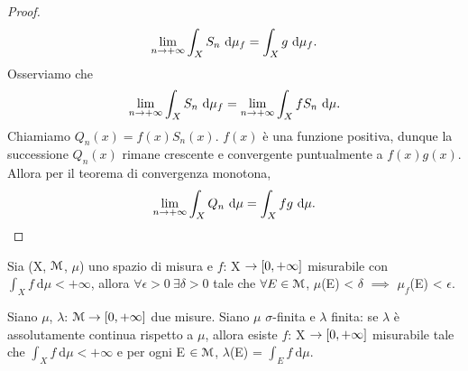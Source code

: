 \documentclass[Completo.tex]{subfiles}
\begin{document}
\begin{proof}
		\begin{equation*}
		\lim_{n \rightarrow +\infty} \int_X S_n \ \mathrm{d}\mu_f = \int_X g \ \mathrm{d}\mu_f.
		\end{equation*}	
		Osserviamo che
		\begin{equation*}
		\lim_{n \ra +\infty} \int_X S_n \ \mathrm{d}\mu_f = \lim_{n \ra +\infty} \int_X f S_n \ \mathrm{d}\mu.
		\end{equation*}
		Chiamiamo $Q_n(x) = f(x)S_n(x)$. $f(x)$ è una funzione positiva, dunque la successione $Q_n(x)$ rimane crescente e convergente puntualmente a $f(x)g(x)$. Allora per il teorema di convergenza monotona,
		\begin{equation*}
		\lim_{n \rightarrow +\infty} \int_X Q_n \ \mathrm{d}\mu = \int_X fg \ \mathrm{d}\mu.
		\end{equation*}
	\end{proof}
	\begin{Cor}
		Sia (X, $\eu[M]$, $\mu$) uno spazio di misura e $f$: X $\rightarrow [0, +\infty]$ misurabile con $\int_X f \ \mathrm{d}\mu < +\infty$, allora $\forall \epsilon > 0 \ \exists \delta > 0$ tale che $\forall E \in \eu[M]$, $\mu$(E) < $\delta$ $\implies$ $\mu_f$(E) < $\epsilon$.
	\end{Cor}
	\begin{Th}
		Siano $\mu$, $\lambda$: $\eu[M] \ra [0, +\infty]$ due misure. Siano $\mu$ $\sigma$-finita e $\lambda$ finita: se $\lambda$ è assolutamente continua rispetto a $\mu$, allora esiste $f$: X $\rightarrow [0, +\infty]$ misurabile tale che $\int_X f \ \mathrm{d}\mu < +\infty$ e per ogni E $\in \eu[M]$, $\lambda$(E) = $\int_E f \ \mathrm{d}\mu$.
	\end{Th}
\end{document}
